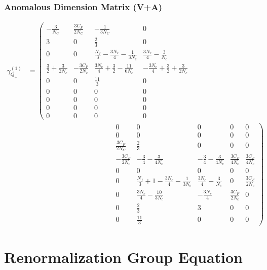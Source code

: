 \documentclass{beamer}
\begin{document}
\begin{frame}
\frametitle{Anomalous Dimension Matrix (V+A)}
\tiny
\begin{equation*}
\begin{split}
       \label{eq:anomalousDimensionMatrixVpA}
       \gamma^{(1)}_{Q_+} &= 
       \left(\begin{matrix}
       	-\frac{3}{N_C} & \frac{3C_F}{2N_C} &-\frac{1}{3N_C} & 0   
       	\\
       	3 & 0 & \frac{2}{3} & 0    \\
       	0 & 0 & \frac{N_f}{3}-\frac{3N_c}{4}-\frac{1}{3N_c} & \frac{3N_c}{4}-\frac{3}{N_c}   \\
       	\frac{3}{2}+\frac{3}{2N_c} & -\frac{3C_F}{2N_c} & \frac{3N_c}{4}+\frac{3}{2}-\frac{11}{6N_c} & -\frac{3N_c}{4}+\frac{3}{2}+\frac{3}{2N_c} \\
       	0 & 0 & \frac{11}{3} & 0 \\
       	0 & 0 & 0 & 0 \\
       	0 & 0 & 0 & 0 \\
       	0 & 0 & 0 & 0 \\
       	0 & 0 & 0 & 0 
       \end{matrix} \right. \\
       &\qquad\qquad\qquad\qquad\qquad\qquad \left.\begin{matrix}
       	0 & 0 & 0 & 0 & 0 \\
       	0 & 0 & 0 & 0 & 0 \\
       	\frac{3C_F}{2N_C} & \frac{2}{3} & 0 & 0 & 0 \\
       	-\frac{3C_F}{2N_c} & -\frac{3}{4}-\frac{3}{4N_c} & -\frac{3}{4}-\frac{3}{4N_c} & \frac{3C_F}{4N_c} & \frac{3C_F}{4N_c} \\
       	0 & 0 & 0 & 0 & 0 \\
       	0 & \frac{N_f}{3}+1-\frac{3N_c}{4}-\frac{1}{3N_c} & \frac{3N_c}{4}-\frac{3}{N_c} & 0  & \frac{3C_F}{2N_c} \\
       	0 & \frac{3N_c}{4}-\frac{10}{3N_c} & -\frac{3N_c}{4} & \frac{3C_F}{2N_c} & 0 \\
       	0 & \frac{2}{3} & 3 & 0 & 0 \\
       	0 & \frac{11}{3} & 0 & 0 & 0 
       \end{matrix}\right)
\end{split}
\end{equation*}
\end{frame}

\section{Renormalization Group Equation}
\end{document}
